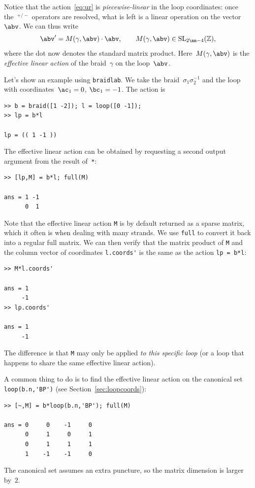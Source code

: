\documentclass[12pt]{article}
\newcommand{\braidlab}{\texttt{braidlab}}%
\newcommand{\braid}{\texttt{braid}}%
\newcommand{\loopc}{\texttt{loop}}%
\begin{document}
Notice that the action~\eqref{eq:ur} is \emph{piecewise-linear} in the loop
coordinates: once the~${}^{+/-}$ operators are resolved, what is left is a
linear operation on the vector~$\abv$.  We can thus write
\begin{equation}
  \abv' = M(\gamma,\abv)\cdot\abv,
  \qquad
  M(\gamma,\abv) \in \mathrm{SL}_{2\nn-4}(\mathbb{Z}),
\end{equation}
where the dot now denotes the standard matrix product.  Here~$M(\gamma,\abv)$
is the \emph{effective linear action} of the braid~$\gamma$ on the
loop~$\abv$.

\index{braid class@\braid\ class!action on \loopc\ (\lstinline{*})|(}%
Let's show an example using \braidlab.  We take the
braid~$\sigma_1\sigma_2^{-1}$ and the loop with coordinates~$\ac_1=0$,
$\bc_1=-1$.  The action is
\begin{lstlisting}[frame=single,framerule=0pt]
>> b = braid([1 -2]); l = loop([0 -1]);
>> lp = b*l

lp = (( 1 -1 ))
\end{lstlisting}
The effective linear action can be obtained by requesting a second output
argument from the result of~\lstinline{*}:
\begin{lstlisting}[frame=single,framerule=0pt]
>> [lp,M] = b*l; full(M)

ans = 1 -1
      0  1
\end{lstlisting}
Note that the effective linear action \lstinline{M} is by default returned as
a sparse matrix, %
%
which it often is when dealing with many strands.  We use \lstinline{full} %
%
to convert it back into a regular full matrix.  We can then verify that the
matrix product of \lstinline{M} and the column vector of coordinates
\lstinline{l.coords'} is the same as the action \lstinline{lp = b*l}:
\begin{lstlisting}[frame=single,framerule=0pt]
>> M*l.coords'

ans = 1
     -1
>> lp.coords'

ans = 1
     -1
\end{lstlisting}
The difference is that \lstinline{M} may only be applied \emph{to this
  specific loop} (or a loop that happens to share the same effective linear
action).

A common thing to do is to find the effective linear action on the canonical
set \lstinline{loop(b.n,'BP')} (see Section~\ref{sec:loopcoords}):
\begin{lstlisting}[frame=single,framerule=0pt]
>> [~,M] = b*loop(b.n,'BP'); full(M)

ans = 0     0    -1     0
      0     1     0     1
      0     1     1     1
      1    -1    -1     0
\end{lstlisting}
The canonical set assumes an extra puncture, so the matrix dimension is larger
by~$2$.
\end{document}

